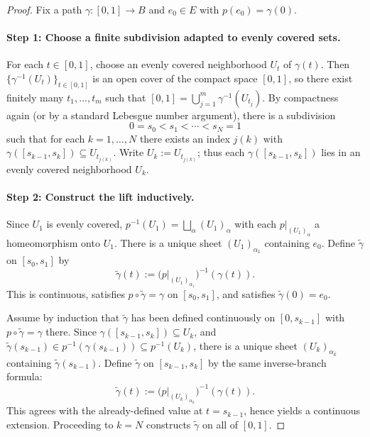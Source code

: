 \documentclass[11pt,a4paper]{article}
\theoremstyle{definition}
\theoremstyle{remark}
\begin{document}
\begin{proof}
Fix a path \(\gamma:[0,1]\to B\) and \(e_0\in E\) with \(p(e_0)=\gamma(0)\).

\paragraph{Step 1: Choose a finite subdivision adapted to evenly covered sets.}
For each \(t\in[0,1]\), choose an evenly covered neighborhood \(U_t\) of \(\gamma(t)\). Then \(\{\gamma^{-1}(U_t)\}_{t\in[0,1]}\) is an open cover of the compact space \([0,1]\), so there exist finitely many \(t_1,\dots,t_m\) such that \([0,1]=\bigcup_{j=1}^m \gamma^{-1}(U_{t_j})\).
By compactness again (or by a standard Lebesgue number argument), there is a subdivision
\[
0=s_0<s_1<\cdots<s_N=1
\]
such that for each \(k=1,\dots,N\) there exists an index \(j(k)\) with
\(
\gamma([s_{k-1},s_k])\subseteq U_{t_{j(k)}}.
\)
Write \(U_k:=U_{t_{j(k)}}\); thus each \(\gamma([s_{k-1},s_k])\) lies in an evenly covered neighborhood \(U_k\).

\paragraph{Step 2: Construct the lift inductively.}
Since \(U_1\) is evenly covered, \(p^{-1}(U_1)=\bigsqcup_{\alpha} (U_1)_\alpha\) with each \(p|_{(U_1)_\alpha}\) a homeomorphism onto \(U_1\).
There is a unique sheet \((U_1)_{\alpha_1}\) containing \(e_0\). Define \(\tilde\gamma\) on \([s_0,s_1]\) by
\[
\tilde\gamma(t):=\bigl(p|_{(U_1)_{\alpha_1}}\bigr)^{-1}(\gamma(t)).
\]
This is continuous, satisfies \(p\circ\tilde\gamma=\gamma\) on \([s_0,s_1]\), and satisfies \(\tilde\gamma(0)=e_0\).

Assume by induction that \(\tilde\gamma\) has been defined continuously on \([0,s_{k-1}]\) with \(p\circ\tilde\gamma=\gamma\) there. Since \(\gamma([s_{k-1},s_k])\subseteq U_k\), and \(\tilde\gamma(s_{k-1})\in p^{-1}(\gamma(s_{k-1}))\subseteq p^{-1}(U_k)\), there is a unique sheet \((U_k)_{\alpha_k}\) containing \(\tilde\gamma(s_{k-1})\). Define \(\tilde\gamma\) on \([s_{k-1},s_k]\) by the same inverse-branch formula:
\[
\tilde\gamma(t):=\bigl(p|_{(U_k)_{\alpha_k}}\bigr)^{-1}(\gamma(t)).
\]
This agrees with the already-defined value at \(t=s_{k-1}\), hence yields a continuous extension. Proceeding to \(k=N\) constructs \(\tilde\gamma\) on all of \([0,1]\).


\end{proof}
\end{document}
